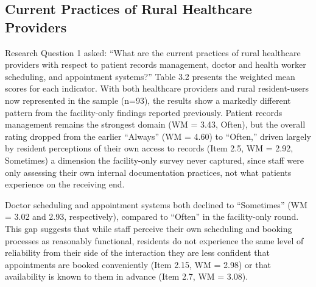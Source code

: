 \documentclass{research}
\begin{document}

\newpage
\subsection{Current Practices of Rural Healthcare Providers}

\indent Research Question 1 asked: ``What are the current practices of rural healthcare providers with respect to patient records management, doctor and health worker scheduling, and appointment systems?'' Table 3.2 presents the weighted mean scores for each indicator.
With both healthcare providers and rural resident-users now represented in the sample (n=93), the results show a markedly different pattern from the facility-only findings reported previously. Patient records management remains the strongest domain (WM = 3.43, Often), but the overall rating dropped from the earlier ``Always'' (WM = 4.60) to ``Often,'' driven largely by resident perceptions of their own access to records (Item 2.5, WM = 2.92, Sometimes) a dimension the facility-only survey never captured, since staff were only assessing their own internal documentation practices, not what patients experience on the receiving end.

Doctor scheduling and appointment systems both declined to ``Sometimes'' (WM = 3.02 and 2.93, respectively), compared to ``Often'' in the facility-only round. This gap suggests that while staff perceive their own scheduling and booking processes as reasonably functional, residents do not experience the same level of reliability from their side of the interaction they are less confident that appointments are booked conveniently (Item 2.15, WM = 2.98) or that availability is known to them in advance (Item 2.7, WM = 3.08).
\end{document}
